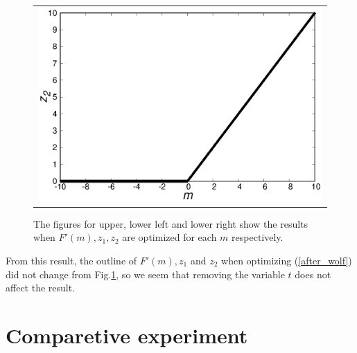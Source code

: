 \documentclass[fp,twocolumn]{jpsj3}
\begin{document}
\begin{figure}[htbp]
\begin{center}
\begin{tabular}{c}
\begin{minipage}{0.50\hsize}
      \end{minipage}
      \begin{minipage}{0.50\hsize}
        \centering
        \includegraphics[keepaspectratio,scale=0.33]{minimum_z2_non_t.eps}
      \end{minipage}
    \end{tabular}
    \caption{The figures for upper, lower left and lower right show the results when $F'(m), z_{1}, z_{2}$ are optimized for each $m$ respectively.}
    \label{fig:minimum2}
  \end{center}
\end{figure}
From this result, the outline of $F'(m), z_{1}$ and $z_{2}$ when optimizing (\ref{after_wolf}) did not change from Fig.\ref{fig:minimum2}, so we seem that removing the variable $t$ does not affect the result.

\section{Comparetive experiment} %
\end{document}
